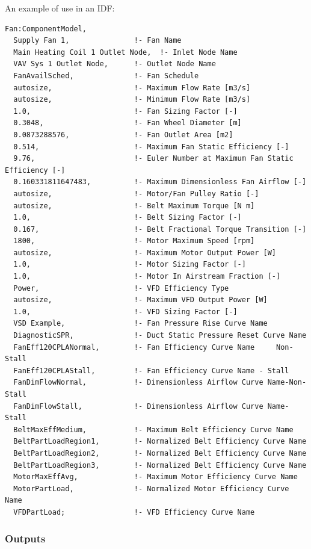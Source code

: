An example of use in an IDF:

\begin{lstlisting}
Fan:ComponentModel,
  Supply Fan 1,               !- Fan Name
  Main Heating Coil 1 Outlet Node,  !- Inlet Node Name
  VAV Sys 1 Outlet Node,      !- Outlet Node Name
  FanAvailSched,              !- Fan Schedule
  autosize,                   !- Maximum Flow Rate [m3/s]
  autosize,                   !- Minimum Flow Rate [m3/s]
  1.0,                        !- Fan Sizing Factor [-]
  0.3048,                     !- Fan Wheel Diameter [m]
  0.0873288576,               !- Fan Outlet Area [m2]
  0.514,                      !- Maximum Fan Static Efficiency [-]
  9.76,                       !- Euler Number at Maximum Fan Static Efficiency [-]
  0.160331811647483,          !- Maximum Dimensionless Fan Airflow [-]
  autosize,                   !- Motor/Fan Pulley Ratio [-]
  autosize,                   !- Belt Maximum Torque [N m]
  1.0,                        !- Belt Sizing Factor [-]
  0.167,                      !- Belt Fractional Torque Transition [-]
  1800,                       !- Motor Maximum Speed [rpm]
  autosize,                   !- Maximum Motor Output Power [W]
  1.0,                        !- Motor Sizing Factor [-]
  1.0,                        !- Motor In Airstream Fraction [-]
  Power,                      !- VFD Efficiency Type
  autosize,                   !- Maximum VFD Output Power [W]
  1.0,                        !- VFD Sizing Factor [-]
  VSD Example,                !- Fan Pressure Rise Curve Name
  DiagnosticSPR,              !- Duct Static Pressure Reset Curve Name
  FanEff120CPLANormal,        !- Fan Efficiency Curve Name     Non-Stall
  FanEff120CPLAStall,         !- Fan Efficiency Curve Name - Stall
  FanDimFlowNormal,           !- Dimensionless Airflow Curve Name-Non-Stall
  FanDimFlowStall,            !- Dimensionless Airflow Curve Name-Stall
  BeltMaxEffMedium,           !- Maximum Belt Efficiency Curve Name
  BeltPartLoadRegion1,        !- Normalized Belt Efficiency Curve Name
  BeltPartLoadRegion2,        !- Normalized Belt Efficiency Curve Name
  BeltPartLoadRegion3,        !- Normalized Belt Efficiency Curve Name
  MotorMaxEffAvg,             !- Maximum Motor Efficiency Curve Name
  MotorPartLoad,              !- Normalized Motor Efficiency Curve Name
  VFDPartLoad;                !- VFD Efficiency Curve Name
\end{lstlisting}

\subsubsection{Outputs}\label{outputs-4-005}

